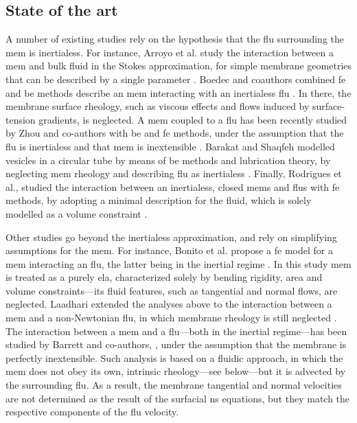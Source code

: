 \subsection{State of the art}\label{sec_state_of_the_art}

A number of existing studies rely on the hypothesis that the \acl{flu} surrounding the \acl{mem} is inertialess.
For instance, Arroyo et al. study the interaction between a \acl{mem} and bulk fluid in the Stokes approximation, for simple membrane geometries that can be described by a single parameter \cite{arroyoRelaxationDynamicsFluid2009i}.
% 
Boedec and coauthors combined  \ac{fe} and \ac{be} methods describe an \acl{mem} interacting with  an inertialess \acl{flu} \cite{boedecIsogeometricFEMBEMSimulations2017}. In there, the membrane surface rheology, such as viscous effects and  flows induced by surface-tension gradients, is neglected.
% 
A \acl{mem} coupled to a \acl{flu} has been recently studied by Zhou and co-authors  with \ac{be} and \ac{fe} methods, under the assumption that the \acl{flu} is inertialess and that \acl{mem}  is  inextensible \cite{zhouModelingSimulationOpen2026}.
% 
Barakat and Shaqfeh  modelled vesicles in a circular tube by means of  \ac{be} methods and lubrication theory, by neglecting \acl{mem} rheology and describing \acl{flu}  as inertialess \cite{barakatStokesFlowVesicles2018}.
% 
Finally, Rodrigues et al., studied the interaction between an inertialess, closed \aclp{mem} and \aclp{flu}  with \ac{fe} methods, by adopting a minimal description for the fluid, which is solely modelled as a volume constraint \cite{rodriguesSemiimplicitFiniteElement2015}.



Other studies go beyond the inertialess approximation, and rely on simplifying assumptions for the \acl{mem}.
% 
For instance, Bonito et al. propose a \ac{fe} model for a \acl{mem} interacting  an \acl{flu},  the latter being in the inertial regime  \cite{bonitoDynamicsBiomembranesEffect2011,bonitoParametricFEMGeometric2010}. In this study \acl{mem} is treated as a purely \acl{ela}, characterized  solely by bending rigidity, area and volume constraints---its fluid features, such as tangential and normal flows, are neglected.
% 
Laadhari extended the analyses above to the interaction   between a \acl{mem} and a non-Newtonian \acl{flu}, in which membrane rheology is still neglected  \cite{laadhariFiniteElementMethodSimulation2023}.
% 
The interaction between a \acl{mem} and a \acl{flu}---both in the inertial regime---has been studied by Barrett and co-authors, \cite{barrettFiniteElementApproximation2016}, under the assumption that the membrane is perfectly inextensible. Such analysis is based on  a fluidic approach, in which the \acl{mem} does not obey its own, intrinsic rheology---see below---but it is advected by the surrounding \acl{flu}. As a result, the membrane tangential and normal velocities are not determined as the result of the surfacial \ac{ns} equations, but they match the respective components of the \acl{flu} velocity.

